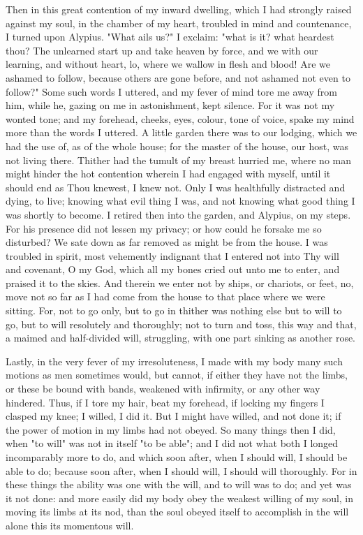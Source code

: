 \documentclass[b5paper,openright,12pt,twoside]{book}
\begin{document}
Then in this great contention of my inward dwelling, which I had
strongly raised against my soul, in the chamber of my heart, troubled in
mind and countenance, I turned upon Alypius. "What ails us?" I exclaim:
"what is it? what heardest thou? The unlearned start up and take heaven
by force, and we with our learning, and without heart, lo, where we
wallow in flesh and blood! Are we ashamed to follow, because others
are gone before, and not ashamed not even to follow?" Some such words I
uttered, and my fever of mind tore me away from him, while he, gazing on
me in astonishment, kept silence. For it was not my wonted tone; and my
forehead, cheeks, eyes, colour, tone of voice, spake my mind more than
the words I uttered. A little garden there was to our lodging, which we
had the use of, as of the whole house; for the master of the house, our
host, was not living there. Thither had the tumult of my breast hurried
me, where no man might hinder the hot contention wherein I had engaged
with myself, until it should end as Thou knewest, I knew not. Only I
was healthfully distracted and dying, to live; knowing what evil thing I
was, and not knowing what good thing I was shortly to become. I retired
then into the garden, and Alypius, on my steps. For his presence did not
lessen my privacy; or how could he forsake me so disturbed? We sate down
as far removed as might be from the house. I was troubled in spirit,
most vehemently indignant that I entered not into Thy will and covenant,
O my God, which all my bones cried out unto me to enter, and praised it
to the skies. And therein we enter not by ships, or chariots, or feet,
no, move not so far as I had come from the house to that place where we
were sitting. For, not to go only, but to go in thither was nothing else
but to will to go, but to will resolutely and thoroughly; not to turn
and toss, this way and that, a maimed and half-divided will, struggling,
with one part sinking as another rose.

Lastly, in the very fever of my irresoluteness, I made with my body many
such motions as men sometimes would, but cannot, if either they have not
the limbs, or these be bound with bands, weakened with infirmity, or
any other way hindered. Thus, if I tore my hair, beat my forehead, if
locking my fingers I clasped my knee; I willed, I did it. But I might
have willed, and not done it; if the power of motion in my limbs had not
obeyed. So many things then I did, when "to will" was not in itself "to
be able"; and I did not what both I longed incomparably more to do, and
which soon after, when I should will, I should be able to do; because
soon after, when I should will, I should will thoroughly. For in these
things the ability was one with the will, and to will was to do; and yet
was it not done: and more easily did my body obey the weakest willing of
my soul, in moving its limbs at its nod, than the soul obeyed itself to
accomplish in the will alone this its momentous will.
\end{document}
